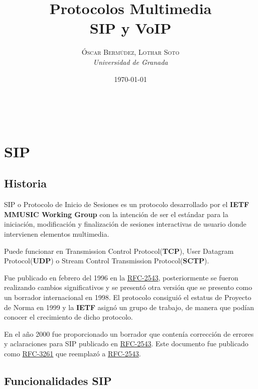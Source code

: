 \documentclass[a4paper, 11pt]{article} %
\title{\textbf{Protocolos Multimedia}\\ %
\vspace{20 pt}
SIP y VoIP} %
\author{\textsc{Óscar Bermúdez, Lothar Soto} %
\\{\textit{Universidad de Granada}}} %
\date{\today} %
\makeatletter
\newcommand{\RFC}[1]{\href{https://www.ietf.org/rfc/rfc#1.txt}{RFC-#1}}
\renewcommand{\maketitle}{ %
\begin{center} %
{\Huge\@title} %
\end{center}

\vspace{20pt} %

\begin{flushright} %
{\large\@author} %
\\\@date %

\vspace{40pt} %
\end{flushright}
}
\makeatother
\begin{document}
\maketitle %

{\parskip=2pt
\tableofcontents
}
\pagebreak

\section{SIP}
	\subsection{Historia}
	SIP o Protocolo de Inicio de Sesiones es un protocolo desarrollado por el \textbf{IETF MMUSIC Working Group} con la intención de ser el estándar para la iniciación, modificación y finalización de sesiones interactivas de usuario donde intervienen elementos multimedia.
	
	Puede funcionar en Transmission Control Protocol(\textbf{TCP}), User Datagram Protocol(\textbf{UDP}) o Stream Control Transmission Protocol(\textbf{SCTP}).
	
	Fue publicado en febrero del 1996 en la \RFC{2543}, posteriormente se fueron realizando cambios significativos y se presentó otra versión que se presento como un borrador internacional en 1998. El protocolo consiguió el estatus de Proyecto de Norma en 1999 y la \textbf{IETF} asignó un grupo de trabajo, de manera que podían conocer el crecimiento de dicho protocolo.
	
	En el año 2000 fue proporcionado un borrador que contenía corrección de errores y aclaraciones para SIP publicado en \RFC{2543}. Este documento fue publicado como \RFC{3261} que reemplazó a \RFC{2543}.
	
	\subsection{Funcionalidades SIP}
\end{document}
